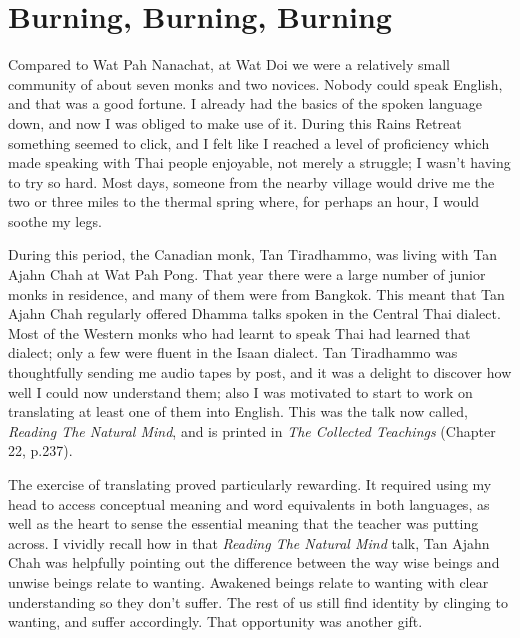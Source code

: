 \chapter{Burning, Burning, Burning}

Compared to Wat Pah Nanachat, at Wat Doi we were a relatively small
community of about seven monks and two novices. Nobody could speak
English, and that was a good fortune. I already had the basics of the
spoken language down, and now I was obliged to make use of it. During
this Rains Retreat something seemed to click, and I felt like I reached
a level of proficiency which made speaking with Thai people enjoyable,
not merely a struggle; I wasn't having to try so hard. Most days,
someone from the nearby village would drive me the two or three miles to
the thermal spring where, for perhaps an hour, I would soothe my legs.

During this period, the Canadian monk, Tan Tiradhammo, was living with
Tan Ajahn Chah at Wat Pah Pong. That year there were a large number of
junior monks in residence, and many of them were from Bangkok. This
meant that Tan Ajahn Chah regularly offered Dhamma talks spoken in the
Central Thai dialect. Most of the Western monks who had learnt to speak
Thai had learned that dialect; only a few were fluent in the Isaan
dialect. Tan Tiradhammo was thoughtfully sending me audio tapes by post,
and it was a delight to discover how well I could now understand them;
also I was motivated to start to work on translating at least one of
them into English. This was the talk now called,
\emph{Reading The Natural Mind}, and is printed in
\emph{The Collected Teachings}\cite{collected} (Chapter 22, p.237).

The exercise of translating proved particularly rewarding. It required
using my head to access conceptual meaning and word equivalents in both
languages, as well as the heart to sense the essential meaning that the
teacher was putting across. I vividly recall how in that \emph{Reading
The Natural Mind} talk, Tan Ajahn Chah was helpfully pointing out the
difference between the way wise beings and unwise beings relate to
wanting. Awakened beings relate to wanting with clear understanding so
they don't suffer. The rest of us still find identity by clinging to
wanting, and suffer accordingly. That opportunity was another gift.

